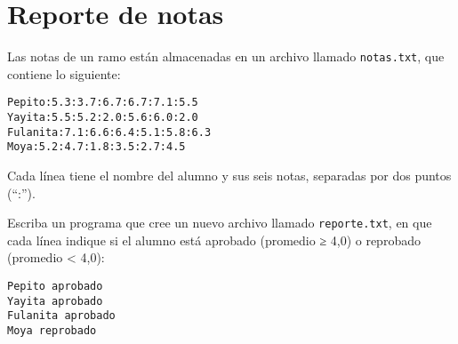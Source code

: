\section{Reporte de notas}

Las notas de un ramo están almacenadas en un archivo llamado
\lstinline!notas.txt!, que contiene lo siguiente:

\begin{lstlisting}
Pepito:5.3:3.7:6.7:6.7:7.1:5.5
Yayita:5.5:5.2:2.0:5.6:6.0:2.0
Fulanita:7.1:6.6:6.4:5.1:5.8:6.3
Moya:5.2:4.7:1.8:3.5:2.7:4.5
\end{lstlisting}

Cada línea tiene el nombre del alumno y sus seis notas, separadas por
dos puntos (``:'').

Escriba un programa que cree un nuevo archivo llamado
\lstinline!reporte.txt!, en que cada línea indique si el alumno está
aprobado (promedio ≥ 4,0) o reprobado (promedio \textless{} 4,0):

\begin{lstlisting}
Pepito aprobado
Yayita aprobado
Fulanita aprobado
Moya reprobado
\end{lstlisting}

